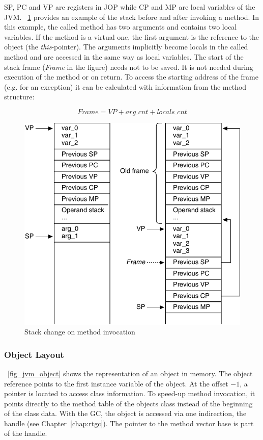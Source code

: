 SP, PC and VP are registers in JOP while CP and MP are local
variables of the JVM. \figurename~\ref{fig_jvm_stack_invoke} provides
an example of the stack before and after invoking a method. In this
example, the called method has two arguments and contains two local
variables. If the method is a virtual one, the first argument is the
reference to the object (the \emph{this}-pointer). The arguments
implicitly become locals in the called method and are accessed in the
same way as local variables. The start of the stack frame
(\emph{Frame} in the figure) needs not to be saved. It is not needed
during execution of the method or on return. To access the starting
address of the frame (e.g. for an exception) it can be calculated
with information from the method structure:

\[Frame = VP + arg\_cnt + locals\_cnt\]

\begin{figure}
    \centering
    \includegraphics[scale=\picscale]{jvm/jvm_stack_invocation}
    \caption{Stack change on method invocation}
    \label{fig_jvm_stack_invoke}
\end{figure}

\subsubsection{Object Layout}

\figurename~\ref{fig_jvm_object} shows the representation of an
object in memory. The object reference points to the first instance
variable of the object. At the offset $-1$, a pointer is located to
access class information. To speed-up method invocation, it points
directly to the method table of the objects class instead of the
beginning of the class data. With the GC, the object is accessed via
one indirection, the handle (see Chapter~\ref{chap:rtgc}). The
pointer to the method vector base is part of the handle.

